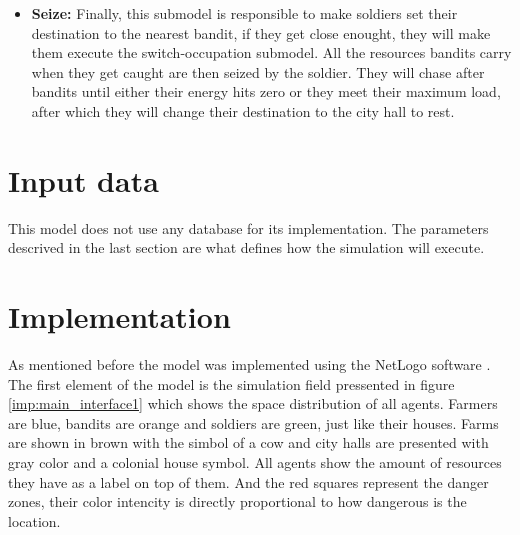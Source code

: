 \documentclass{wscpaperproc}
\begin{document}
\begin{itemize}
    \item \textbf{Seize:} Finally, this submodel is responsible to make
    soldiers set their destination to the nearest bandit, if they get close
    enought, they will make them execute the switch-occupation submodel. All
    the resources bandits carry when they get caught are then seized by the
    soldier. They will chase after bandits until either their energy hits zero
    or they meet their maximum load, after which they will change their
    destination to the city hall to rest.

\end{itemize}

\section{Input data}

This model does not use any database for its implementation. The parameters
descrived in the last section are what defines how the simulation will execute.

\section{Implementation}

As mentioned before the model was implemented using the NetLogo software
\cite{netlogo}. The first element of the model is the simulation field
pressented in figure \ref{imp:main_interface1} which shows the space distribution
of all agents. Farmers are blue, bandits are orange and soldiers are
green, just like their houses. Farms are shown in brown with the simbol of a cow
and city halls are presented with gray color and a colonial house symbol. All
agents show the amount of resources they have as a label on top of them. And the
red squares represent the danger zones, their color intencity is directly
proportional to how dangerous is the location.

\newpage
\end{document}
